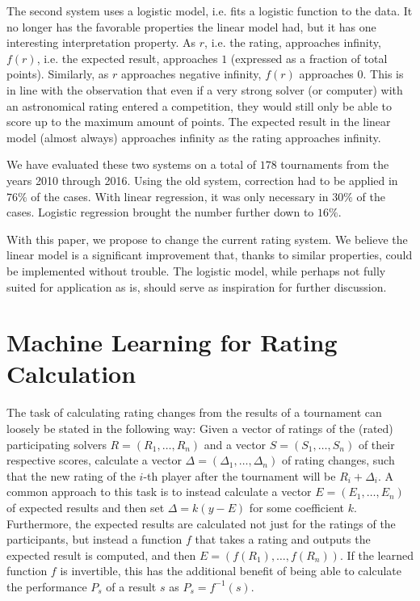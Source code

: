 \documentclass{article}
\newcommand{\E}{E}
\begin{document}
The second system uses a logistic model, i.e. fits a logistic function to the data.
It no longer has the favorable properties the linear model had, but it has one interesting interpretation property.
As $r$, i.e. the rating, approaches infinity, $f(r)$, i.e. the expected result, approaches $1$ (expressed as a fraction of total points).
Similarly, as $r$ approaches negative infinity, $f(r)$ approaches $0$.
This is in line with the observation that even if a very strong solver (or computer) with an astronomical rating entered a competition, they would still only be able to score up to the maximum amount of points.
The expected result in the linear model (almost always) approaches infinity as the rating approaches infinity.

We have evaluated these two systems on a total of $178$ tournaments from the years 2010 through 2016.
Using the old system, correction had to be applied in $76\%$ of the cases.
With linear regression, it was only necessary in $30\%$ of the cases.
Logistic regression brought the number further down to $16\%$.

With this paper, we propose to change the current rating system.
We believe the linear model is a significant improvement that, thanks to similar properties, could be implemented without trouble.
The logistic model, while perhaps not fully suited for application as is, should serve as inspiration for further discussion.

\section{Machine Learning for Rating Calculation}
The task of calculating rating changes from the results of a tournament can loosely be stated in the following way:
Given a vector of ratings of the (rated) participating solvers $R=(R_1,\ldots,R_n)$ and a vector $S=(S_1,\ldots,S_n)$ of their respective scores, calculate a vector $\Delta=(\Delta_1,\ldots,\Delta_n)$ of rating changes, such that the new rating of the $i$-th player after the tournament will be $R_i+\Delta_i$.
A common approach to this task is to instead calculate a vector $\E=(\E_1,\ldots,\E_n)$ of expected results and then set $\Delta=k(y-\E)$ for some coefficient $k$.
Furthermore, the expected results are calculated not just for the ratings of the participants, but instead a function $f$ that takes a rating and outputs the expected result is computed, and then $\E=(f(R_1),\ldots,f(R_n))$.
If the learned function $f$ is invertible, this has the additional benefit of being able to calculate the performance $P_s$ of a result $s$ as $P_s=f^{-1}(s)$.
\end{document}
